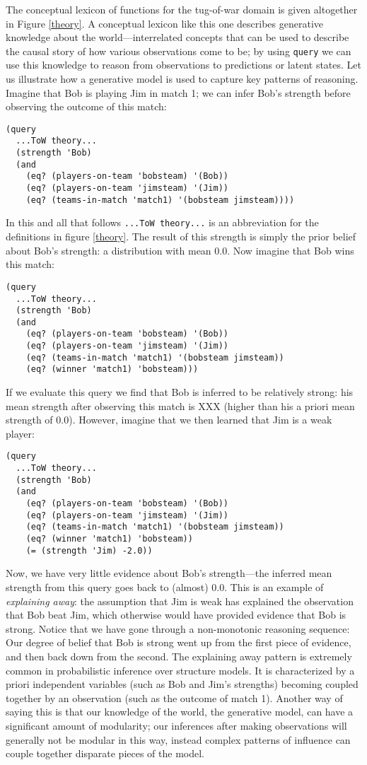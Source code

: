 \documentclass[12pt]{article}
\newcounter{definition}
\begin{document}
The conceptual lexicon of functions for the tug-of-war domain is given altogether in Figure \ref{theory}.
A conceptual lexicon like this one describes generative knowledge about the world---interrelated concepts that can be used to describe the causal story of how various observations come to be; by using \lstinline{query} we can use this knowledge to reason from observations to predictions or latent states. Let us illustrate how a generative model is used to capture key patterns of reasoning. Imagine that Bob is playing Jim in match 1; we can infer Bob's strength before observing the outcome of this match:
\begin{lstlisting}[mathescape]
(query
  ...ToW theory...
  (strength 'Bob)
  (and 
    (eq? (players-on-team 'bobsteam) '(Bob))
    (eq? (players-on-team 'jimsteam) '(Jim))
    (eq? (teams-in-match 'match1) '(bobsteam jimsteam))))
\end{lstlisting}
In this and all that follows \lstinline{...ToW theory...} is an abbreviation for the definitions in figure \ref{theory}. The result of this strength is simply the prior belief about Bob's strength: a distribution with mean 0.0.
Now imagine that Bob wins this match:
\begin{lstlisting}[mathescape]
(query
  ...ToW theory...
  (strength 'Bob)
  (and 
    (eq? (players-on-team 'bobsteam) '(Bob))
    (eq? (players-on-team 'jimsteam) '(Jim))
    (eq? (teams-in-match 'match1) '(bobsteam jimsteam))
    (eq? (winner 'match1) 'bobsteam)))
\end{lstlisting}
If we evaluate this query we find that Bob is inferred to be relatively strong: his mean strength after observing this match is XXX (higher than his a priori mean strength of $0.0$). However, imagine that we then learned that Jim is a weak player:
 \begin{lstlisting}[mathescape]
(query
  ...ToW theory...
  (strength 'Bob)
  (and 
    (eq? (players-on-team 'bobsteam) '(Bob))
    (eq? (players-on-team 'jimsteam) '(Jim))
    (eq? (teams-in-match 'match1) '(bobsteam jimsteam))
    (eq? (winner 'match1) 'bobsteam))
    (= (strength 'Jim) -2.0))
\end{lstlisting}
Now, we have very little evidence about Bob's strength---the inferred mean strength from this query goes back to (almost) 0.0. This is an example of \emph{explaining away}: the assumption that Jim is weak has explained the observation that  Bob beat Jim, which otherwise would have provided evidence that Bob is strong. Notice that we have gone through a non-monotonic reasoning sequence: Our degree of belief that Bob is strong went up from the first piece of evidence, and then back down from the second. The explaining away pattern is extremely common in probabilistic inference over structure models. It is characterized by a priori independent variables (such as Bob and Jim's strengths) becoming coupled together by an observation (such as the outcome of match 1). Another way of saying this is that our knowledge of the world, the generative model, can have a significant amount of modularity; our inferences after making observations will generally not be modular in this way, instead complex patterns of influence can couple together disparate pieces of the model.
\end{document}
